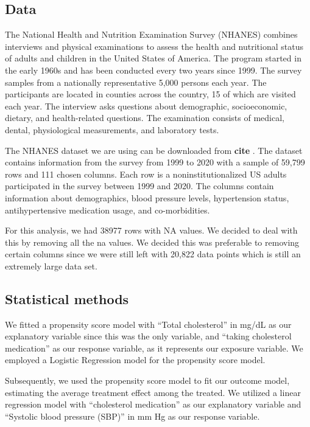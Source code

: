 \documentclass[useAMS,usenatbib,referee]{biom}
\begin{document}
\hypertarget{data}{%
\subsection{Data}\label{data}}

The National Health and Nutrition Examination Survey (NHANES) combines
interviews and physical examinations to assess the health and
nutritional status of adults and children in the United States of
America. The program started in the early 1960s and has been conducted
every two years since 1999. The survey samples from a nationally
representative 5,000 persons each year. The participants are located in
counties across the country, 15 of which are visited each year. The
interview asks questions about demographic, socioeconomic, dietary, and
health-related questions. The examination consists of medical, dental,
physiological measurements, and laboratory tests.

The NHANES dataset we are using can be downloaded from \textbf{cite} .
The dataset contains information from the survey from 1999 to 2020 with
a sample of 59,799 rows and 111 chosen columns. Each row is a
noninstitutionalized US adults participated in the survey between 1999
and 2020. The columns contain information about demographics, blood
pressure levels, hypertension status, antihypertensive medication usage,
and co-morbidities.

For this analysis, we had 38977 rows with NA values. We decided to deal
with this by removing all the na values. We decided this was preferable
to removing certain columns since we were still left with 20,822 data
points which is still an extremely large data set.

\hypertarget{statistical-methods}{%
\subsection{Statistical methods}\label{statistical-methods}}

We fitted a propensity score model with ``Total cholesterol'' in mg/dL
as our explanatory variable since this was the only variable, and
``taking cholesterol medication'' as our response variable, as it
represents our exposure variable. We employed a Logistic Regression
model for the propensity score model.

Subsequently, we used the propensity score model to fit our outcome
model, estimating the average treatment effect among the treated. We
utilized a linear regression model with ``cholesterol medication'' as
our explanatory variable and ``Systolic blood pressure (SBP)'' in mm Hg
as our response variable.
\end{document}
